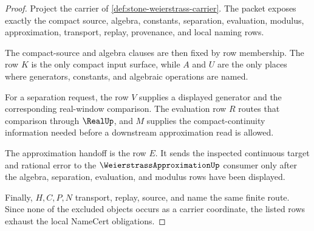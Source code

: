\begin{proof}
Project the carrier of \autoref{def:stone-weierstrass-carrier}. The packet exposes exactly the compact source, algebra, constants, separation, evaluation, modulus, approximation, transport, replay, provenance, and local naming rows.

The compact-source and algebra clauses are then fixed by row membership. The row $K$ is the only compact input surface, while $A$ and $U$ are the only places where generators, constants, and algebraic operations are named.

For a separation request, the row $V$ supplies a displayed generator and the corresponding real-window comparison. The evaluation row $R$ routes that comparison through $\RealUp$, and $M$ supplies the compact-continuity information needed before a downstream approximation read is allowed.

The approximation handoff is the row $E$. It sends the inspected continuous target and rational error to the $\WeierstrassApproximationUp$ consumer only after the algebra, separation, evaluation, and modulus rows have been displayed.

Finally, $H,C,P,N$ transport, replay, source, and name the same finite route. Since none of the excluded objects occurs as a carrier coordinate, the listed rows exhaust the local NameCert obligations.
\end{proof}

